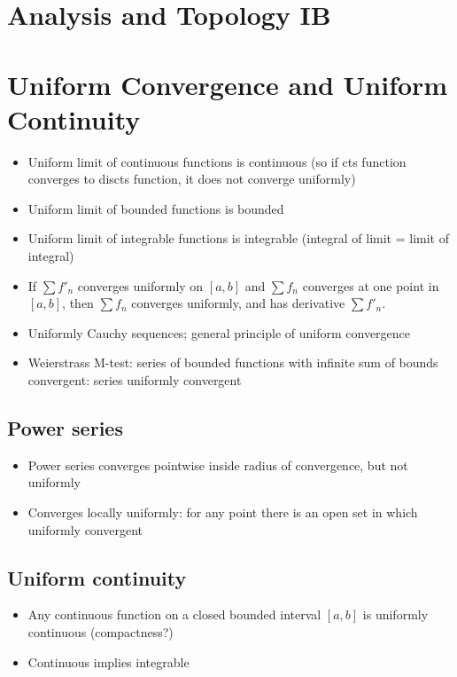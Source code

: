 


\section*{Analysis and Topology \hfill IB}

\section{Uniform Convergence and Uniform Continuity}
\begin{itemize}
    \item Uniform limit of continuous functions is continuous (so if cts function converges to discts function, it does not converge uniformly)
    \item Uniform limit of bounded functions is bounded
    \item Uniform limit of integrable functions is integrable (integral of limit = limit of integral)
    \item If $\sum f'_n$ converges uniformly on $[a,b]$ and $\sum f_n$ converges at one point in $[a,b]$, then $\sum f_n$ converges uniformly, and has derivative $\sum f'_n$.
    \item Uniformly Cauchy sequences; general principle of uniform convergence
    \item Weierstrass M-test: series of bounded functions with infinite sum of bounds convergent: series uniformly convergent
\end{itemize}
\subsection*{Power series}
\begin{itemize}
    \item Power series converges pointwise inside radius of convergence, but not uniformly
    \item Converges locally uniformly: for any point there is an open set in which uniformly convergent
\end{itemize}

\subsection*{Uniform continuity}
\begin{itemize}
    \item Any continuous function on a closed bounded interval $[a,b]$ is uniformly continuous (compactness?)
    \item Continuous implies integrable
\end{itemize}
